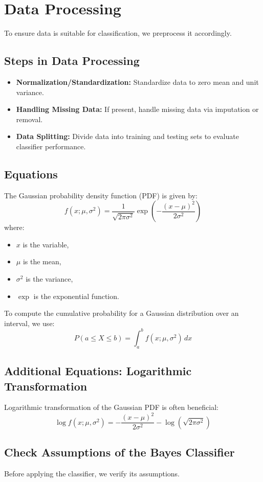 \documentclass[conference]{IEEEtran}
\begin{document}
	\section{Data Processing}
	To ensure data is suitable for classification, we preprocess it accordingly.
	
	\subsection{Steps in Data Processing}
	\begin{itemize}
		\item \textbf{Normalization/Standardization:} Standardize data to zero mean and unit variance.
		\item \textbf{Handling Missing Data:} If present, handle missing data via imputation or removal.
		\item \textbf{Data Splitting:} Divide data into training and testing sets to evaluate classifier performance.
	\end{itemize}
	
	\subsection{Equations}
	The Gaussian probability density function (PDF) is given by:
	\[
	f(x; \mu, \sigma^2) = \frac{1}{\sqrt{2 \pi \sigma^2}} \exp\left(-\frac{(x - \mu)^2}{2 \sigma^2}\right)
	\]
	where:
	\begin{itemize}
		\item \( x \) is the variable,
		\item \( \mu \) is the mean,
		\item \( \sigma^2 \) is the variance,
		\item \( \exp \) is the exponential function.
	\end{itemize}
	
	To compute the cumulative probability for a Gaussian distribution over an interval, we use:
	\[
	P(a \leq X \leq b) = \int_{a}^{b} f(x; \mu, \sigma^2) \, dx
	\]
	
	\subsection{Additional Equations: Logarithmic Transformation}
	Logarithmic transformation of the Gaussian PDF is often beneficial:
	\[
	\log f(x; \mu, \sigma^2) = -\frac{(x - \mu)^2}{2 \sigma^2} - \log(\sqrt{2 \pi \sigma^2})
	\]
	
	\subsection{Check Assumptions of the Bayes Classifier}
	Before applying the classifier, we verify its assumptions.
	
\end{document}
